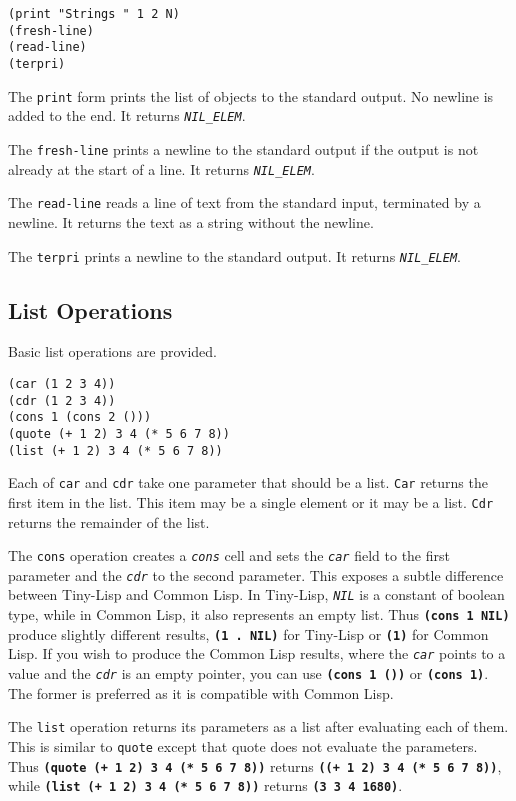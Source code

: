 \documentclass[10pt, openany]{book}
\newcommand{\operation}[1]{\textbf{\texttt{#1}}}
\newcommand{\function}[1]{\texttt{#1}}
\newcommand{\constant}[1]{\emph{\texttt{#1}}}
\newcommand{\tl}{Tiny-Lisp}
\newcommand{\cl}{Common Lisp}
\begin{document}
\begin{lstlisting}
(print "Strings " 1 2 N)
(fresh-line)
(read-line)
(terpri)
\end{lstlisting}

The \function{print} form prints the list of objects to the standard output.  No newline is added to the end.  It returns \constant{NIL\_ELEM}.

The \function{fresh-line} prints a newline to the standard output if the output is not already at the start of a line.  It returns \constant{NIL\_ELEM}.

The \function{read-line} reads a line of text from the standard input, terminated by a newline.  It returns the text as a string without the newline.

The \function{terpri} prints a newline to the standard output.  It returns \constant{NIL\_ELEM}.

\subsection{List Operations}
Basic list operations are provided.
\begin{lstlisting}
(car (1 2 3 4))
(cdr (1 2 3 4))
(cons 1 (cons 2 ()))
(quote (+ 1 2) 3 4 (* 5 6 7 8))
(list (+ 1 2) 3 4 (* 5 6 7 8))
\end{lstlisting}

Each of \function{car} and \function{cdr} take one parameter that should be a list.  \function{Car} returns the first item in the list.  This item may be a single element or it may be a list.  \function{Cdr} returns the remainder of the list.

The \function{cons} operation creates a \constant{cons} cell and sets the \constant{car} field to the first parameter and the \constant{cdr} to the second parameter.  This exposes a subtle difference between \tl{} and \cl.  In \tl, \constant{NIL} is a constant of boolean type, while in \cl, it also represents an empty list.  Thus \operation{(cons 1 NIL)} produce slightly different results, \operation{(1 . NIL)} for \tl{} or \operation{(1)} for \cl.  If you wish to produce the \cl{} results, where the \constant{car} points to a value and the \constant{cdr} is an empty pointer, you can use \operation{(cons 1 ())} or \operation{(cons 1)}.  The former is preferred as it is compatible with \cl.

The \function{list} operation returns its parameters as a list after evaluating each of them.  This is similar to \function{quote} except that quote does not evaluate the parameters.  Thus \operation{(quote (+ 1 2) 3 4 (* 5 6 7 8))} returns \operation{((+ 1 2) 3 4 (* 5 6 7 8))}, while \operation{(list (+ 1 2) 3 4 (* 5 6 7 8))} returns \operation{(3 3 4 1680)}.
\end{document}
